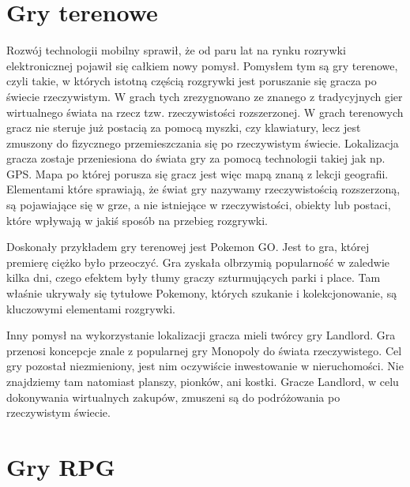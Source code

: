 \documentclass{xmgr}
\begin{document}
\section{Gry terenowe}

Rozwój technologii mobilny sprawił, że od paru lat na rynku rozrywki elektronicznej pojawił się całkiem nowy pomysł. Pomysłem tym są gry terenowe, czyli takie, w których istotną częścią rozgrywki jest poruszanie się gracza po świecie rzeczywistym. W grach tych zrezygnowano ze znanego z tradycyjnych gier wirtualnego świata na rzecz tzw. rzeczywistości rozszerzonej. W grach terenowych gracz nie steruje już postacią za pomocą myszki, czy klawiatury, lecz jest zmuszony do fizycznego przemieszczania się po rzeczywistym świecie. Lokalizacja gracza zostaje przeniesiona do świata gry za pomocą technologii takiej jak np. GPS. Mapa po której porusza się gracz jest więc mapą znaną z lekcji geografii. Elementami które sprawiają, że świat gry nazywamy rzeczywistością rozszerzoną, są pojawiające się w grze, a nie istniejące w rzeczywistości, obiekty lub postaci, które wpływają w jakiś sposób na przebieg rozgrywki.

Doskonały przykładem gry terenowej jest Pokemon GO. Jest to gra, której premierę ciężko było przeoczyć. Gra zyskała olbrzymią popularność w zaledwie kilka dni, czego efektem były tłumy graczy szturmujących parki i place. Tam właśnie ukrywały się tytułowe Pokemony, których szukanie i kolekcjonowanie, są kluczowymi elementami rozgrywki.

Inny pomysł na wykorzystanie lokalizacji gracza mieli twórcy gry Landlord. Gra przenosi koncepcje znale z popularnej gry Monopoly do świata rzeczywistego. Cel gry pozostał niezmieniony, jest nim oczywiście inwestowanie w nieruchomości. Nie znajdziemy tam natomiast planszy, pionków, ani kostki. Gracze Landlord, w celu dokonywania wirtualnych zakupów, zmuszeni są do podróżowania po rzeczywistym świecie.

\section{Gry RPG}
\end{document}
